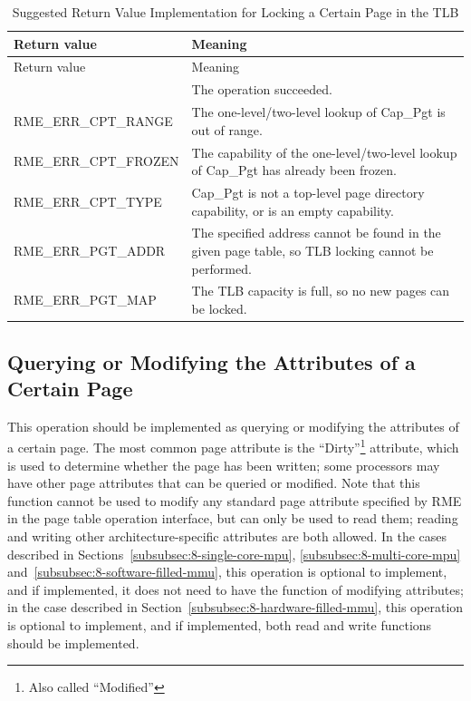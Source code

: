 \begin{xltabular}{\textwidth}{@{}>{\hsize\raggedright\arraybackslash}X>{\hsize\raggedright\arraybackslash}X@{}}
\caption{Suggested Return Value Implementation for Locking a Certain Page in the TLB}\label{tab:8-12-lock-page-in-tlb-suggested-return-values}\\
\toprule
Return value & Meaning\tabularnewline
\endfirsthead
\toprule
Return value & Meaning\tabularnewline
\midrule
\endhead
\bottomrule
{} & The operation succeeded.\tabularnewline
    RME\_ERR\_CPT\_RANGE & The one-level/two-level lookup of Cap\_Pgt is out of range.\tabularnewline
    RME\_ERR\_CPT\_FROZEN & The capability of the one-level/two-level lookup of Cap\_Pgt has already been frozen.\tabularnewline
    RME\_ERR\_CPT\_TYPE & Cap\_Pgt is not a top-level page directory capability, or is an empty capability.\tabularnewline
    RME\_ERR\_PGT\_ADDR & The specified address cannot be found in the given page table, so TLB locking cannot be performed.\tabularnewline
    RME\_ERR\_PGT\_MAP & The TLB capacity is full, so no new pages can be locked.\tabularnewline
\end{xltabular}
\nopagebreak[4]

\subsection{Querying or Modifying the Attributes of a Certain Page}\label{subsec:8-query-or-modify-page-attributes}

This operation should be implemented as querying or modifying the attributes of a certain page. The most common page attribute is the ``Dirty''\footnote{Also called ``Modified''} attribute, which is used to determine whether the page has been written; some processors may have other page attributes that can be queried or modified. Note that this function cannot be used to modify any standard page attribute specified by RME in the page table operation interface, but can only be used to read them; reading and writing other architecture-specific attributes are both allowed. In the cases described in Sections~\ref{subsubsec:8-single-core-mpu}, \ref{subsubsec:8-multi-core-mpu} and~\ref{subsubsec:8-software-filled-mmu}, this operation is optional to implement, and if implemented, it does not need to have the function of modifying attributes; in the case described in Section~\ref{subsubsec:8-hardware-filled-mmu}, this operation is optional to implement, and if implemented, both read and write functions should be implemented.

